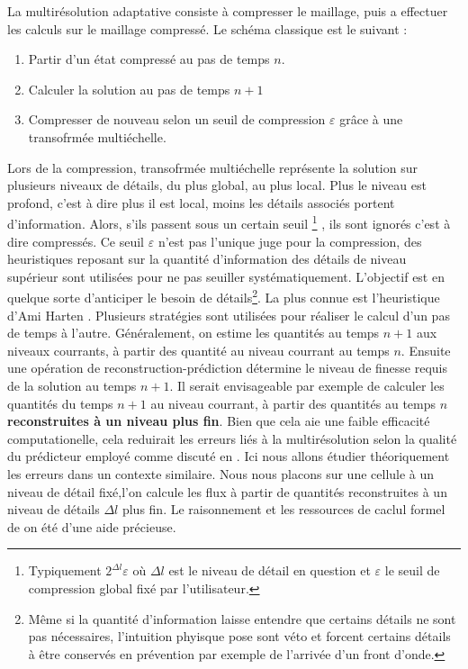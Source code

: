 La multirésolution adaptative consiste à compresser le maillage, puis a effectuer les calculs sur le maillage compressé.
Le schéma classique est le suivant : 
\begin{enumerate}
    \item Partir d'un état compressé au pas de temps $n$.
    \item Calculer la solution au pas de temps $n+1$
    \item Compresser de nouveau selon un seuil de compression $\varepsilon$ grâce à une transofrmée multiéchelle.
\end{enumerate}
Lors de la compression, transofrmée multiéchelle représente la solution sur plusieurs niveaux de détails, du plus global, au plus local.
Plus le niveau est profond, c'est à dire plus il est local, moins les détails associés portent d'information. Alors, s'ils passent sous un certain seuil
\footnote{Typiquement $2^{\Delta l} \varepsilon$ où ${\Delta l}$ est le niveau de détail en question et $\varepsilon$ le seuil de compression global fixé par l'utilisateur.}
, ils sont ignorés\cite{postelApprox} c'est à dire compressés.
Ce seuil $\varepsilon$ n'est pas l'unique juge pour la compression, des heuristiques reposant sur la quantité d'information des détails de niveau supérieur
sont utilisées pour ne pas seuiller systématiquement. L'objectif est en quelque sorte d'anticiper le besoin de détails\footnote{Même si la quantité d'information laisse entendre que 
certains détails ne sont pas nécessaires, l'intuition phyisque pose sont véto et forcent certains détails à être conservés en prévention par exemple de l'arrivée d'un front d'onde.}.
La plus connue est l'heuristique d'Ami Harten \cite{harten1994}.
Plusieurs stratégies sont utilisées pour réaliser le calcul d'un pas de temps à l'autre. Généralement, on estime les quantités au temps $n+1$ aux niveaux courrants, 
à partir des quantité au niveau courrant au temps $n$. Ensuite une opération de reconstruction-prédiction détermine le niveau de finesse requis de la solution au temps $n+1$.
Il serait envisageable par exemple de calculer les quantités du temps $n+1$ au niveau courrant, à partir 
des quantités au temps $n$ \textbf{reconstruites à un niveau plus fin}. Bien que cela aie une faible efficacité computationelle, cela reduirait les erreurs liés à la multirésolution
selon la qualité du prédicteur employé comme discuté en \cite{belloti_et_al_2025}. Ici nous allons étudier théoriquement les erreurs dans un contexte similaire. 
Nous nous placons sur une cellule à un niveau de détail fixé,l'on calcule les flux à partir de quantités reconstruites à un niveau de détails $\Delta l$ plus fin.
Le raisonnement et les ressources de caclul formel de \cite{belloti_et_al_2025} on été d'une aide précieuse.


